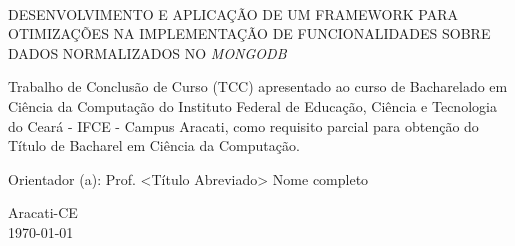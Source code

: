 \vfill
\begin{center}

{\imprimirautor\\}
\vspace{3cm}
{\textsc{\uppercase{Desenvolvimento e Aplicação de um Framework para Otimizações na Implementação de Funcionalidades Sobre Dados Normalizados no \textit{MongoDB}}}\\}
\vspace{5cm}
\hspace{.45\linewidth}
\begin{minipage}{.50\linewidth}
Trabalho de Conclusão de Curso (TCC) apresentado ao curso de Bacharelado em Ciência da Computação do Instituto Federal de Educação, Ciência e Tecnologia do Ceará - IFCE - Campus Aracati, como requisito parcial para obtenção do Título de Bacharel em Ciência da Computação.

\vspace{0.5 cm}

Orientador (a): Prof. <Título Abreviado> Nome completo 

\end{minipage}

\vspace{2cm}
\vfill
{\large Aracati-CE\\\today}

\end{center}
